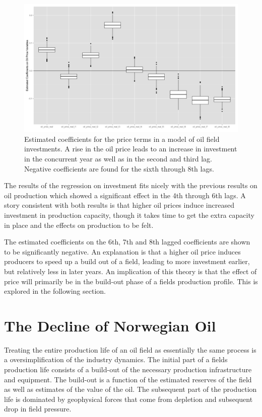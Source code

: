 \documentclass[12pt]{article}
\begin{document}
\begin{figure}
	\includegraphics[width=1\textwidth]{figures/invest_pooled_print.png}
	\caption{Estimated coefficients for the price terms in a model of oil field investments.  A rise in the oil price leads to an increase in investment in the concurrent year as well as in the second and third lag. Negative coefficients are found for the sixth through 8th lags.}
	\label{gam_price_invest_box}
\end{figure}

The results of the regression on investment fits nicely with the previous results on oil production which showed a significant effect in the 4th through 6th lags.  A story consistent with both results is that higher oil prices induce increased investment in production capacity, though it takes time to get the extra capacity in place and the effects on production to be felt.

The estimated coefficients on the 6th, 7th and 8th lagged coefficients are shown to be significantly negative. An explanation is that a higher oil price induces producers to speed up a build out of a field, leading to more investment earlier, but relatively less in later years.  An implication of this theory is that the effect of price will primarily be in the build-out phase of a fields production profile.  This is explored in the following section.

\section{The Decline of Norwegian Oil}

Treating the entire production life of an oil field as essentially the same process is a oversimplification of the industry dynamics.  The initial part of a fields production life consists of a build-out of the necessary production infrastructure and equipment.  The build-out is a function of the estimated reserves of the field as well as estimates of the value of the oil.  The subsequent part of the production life is dominated by geophysical forces that come from depletion and subsequent drop in field pressure.  
\end{document}

